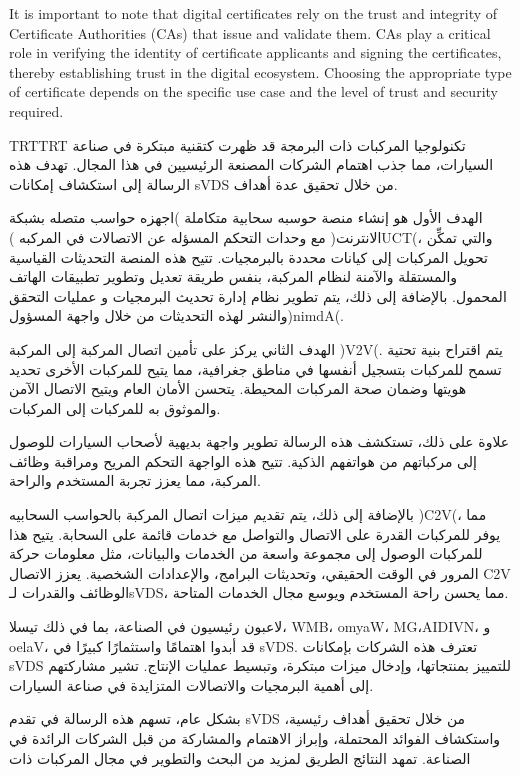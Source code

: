 \documentclass[
12pt,
oneside, 
onehalfspacing, 
nolistspacing, 
parskip, 
chapterinoneline, 
]{AASTCOMPUTER}
\newenvironment{Arabic}    
    {\textdir TRT\pardir TRT\arabicfont}{}
\begin{document}
It is important to note that digital certificates rely on the trust and integrity of Certificate Authorities (CAs) that issue and validate them. CAs play a critical role in verifying the identity of certificate applicants and signing the certificates, thereby establishing trust in the digital ecosystem. Choosing the appropriate type of certificate depends on the specific use case and the level of trust and security required.
\begin{arabicabstractp}
\begin{Arabic}
	تكنولوجيا المركبات ذات البرمجة قد ظهرت كتقنية مبتكرة في صناعة السيارات، مما جذب اهتمام الشركات المصنعة الرئيسيين في هذا المجال. تهدف هذه الرسالة إلى استكشاف إمكانات sVDS من خلال تحقيق عدة أهداف.

	الهدف الأول هو إنشاء منصة حوسبه سحابية متكاملة )اجهزه حواسب متصله بشبكة الانترنت( مع وحدات التحكم المسؤله عن الاتصالات في المركبه )UCT(، والتي تمكِّن تحويل المركبات إلى كيانات محددة بالبرمجيات. تتيح هذه المنصة التحديثات القياسية والمستقلة والآمنة لنظام المركبة، بنفس طريقة تعديل وتطوير تطبيقات الهاتف المحمول. بالإضافة إلى ذلك، يتم تطوير نظام إدارة تحديث البرمجيات و عمليات التحقق والنشر لهذه  التحديثات من خلال واجهة المسؤول)nimdA(.
	
	الهدف الثاني يركز على تأمين اتصال المركبة إلى المركبة )V2V(. يتم اقتراح بنية تحتية تسمح للمركبات بتسجيل أنفسها في مناطق جغرافية، مما يتيح للمركبات الأخرى تحديد هويتها وضمان صحة المركبات المحيطة. يتحسن الأمان العام ويتيح الاتصال الآمن والموثوق به للمركبات إلى المركبات.
	
	علاوة على ذلك، تستكشف هذه الرسالة تطوير واجهة بديهية لأصحاب السيارات للوصول إلى مركباتهم من هواتفهم الذكية. تتيح هذه الواجهة التحكم المريح ومراقبة وظائف المركبة، مما يعزز تجربة المستخدم والراحة.
	
	بالإضافة إلى ذلك، يتم تقديم ميزات اتصال المركبة بالحواسب السحابيه )C2V(، مما يوفر للمركبات القدرة على الاتصال والتواصل مع خدمات قائمة على السحابة. يتيح هذا للمركبات الوصول إلى مجموعة واسعة من الخدمات والبيانات، مثل معلومات حركة المرور في الوقت الحقيقي، وتحديثات البرامج، والإعدادات الشخصية. يعزز الاتصال C2V الوظائف والقدرات لـsVDS، مما يحسن راحة المستخدم ويوسع مجال الخدمات المتاحة.
	
	لاعبون رئيسيون في الصناعة، بما في ذلك تيسلا، WMB، omyaW، MG،AIDIVN، و oelaV، قد أبدوا اهتمامًا واستثمارًا كبيرًا في sVDS. تعترف هذه الشركات بإمكانات sVDS للتمييز بمنتجاتها، وإدخال ميزات مبتكرة، وتبسيط عمليات الإنتاج. تشير مشاركتهم إلى أهمية البرمجيات والاتصالات المتزايدة في صناعة السيارات.
	
	بشكل عام، تسهم هذه الرسالة في تقدم sVDS من خلال تحقيق أهداف رئيسية، واستكشاف الفوائد المحتملة، وإبراز الاهتمام والمشاركة من قبل الشركات الرائدة في الصناعة. تمهد النتائج الطريق لمزيد من البحث والتطوير في مجال المركبات ذات 
\end{Arabic}
\end{arabicabstractp}
\end{document}
